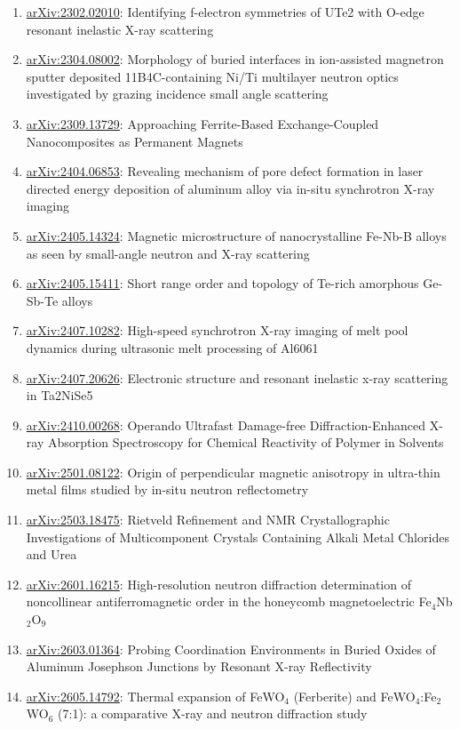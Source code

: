\begin{small}
\begin{enumerate}
  \item \href{https://arxiv.org/abs/2302.02010}{arXiv:2302.02010}: Identifying f-electron symmetries of UTe2 with O-edge resonant inelastic X-ray scattering
  \item \href{https://arxiv.org/abs/2304.08002}{arXiv:2304.08002}: Morphology of buried interfaces in ion-assisted magnetron sputter deposited 11B4C-containing Ni/Ti multilayer neutron optics investigated by grazing incidence small angle scattering
  \item \href{https://arxiv.org/abs/2309.13729}{arXiv:2309.13729}: Approaching Ferrite-Based Exchange-Coupled Nanocomposites as Permanent Magnets
  \item \href{https://arxiv.org/abs/2404.06853}{arXiv:2404.06853}: Revealing mechanism of pore defect formation in laser directed energy deposition of aluminum alloy via in-situ synchrotron X-ray imaging
  \item \href{https://arxiv.org/abs/2405.14324}{arXiv:2405.14324}: Magnetic microstructure of nanocrystalline Fe-Nb-B alloys as seen by small-angle neutron and X-ray scattering
  \item \href{https://arxiv.org/abs/2405.15411}{arXiv:2405.15411}: Short range order and topology of Te-rich amorphous Ge-Sb-Te alloys
  \item \href{https://arxiv.org/abs/2407.10282}{arXiv:2407.10282}: High-speed synchrotron X-ray imaging of melt pool dynamics during ultrasonic melt processing of Al6061
  \item \href{https://arxiv.org/abs/2407.20626}{arXiv:2407.20626}: Electronic structure and resonant inelastic x-ray scattering in Ta2NiSe5
  \item \href{https://arxiv.org/abs/2410.00268}{arXiv:2410.00268}: Operando Ultrafast Damage-free Diffraction-Enhanced X-ray Absorption Spectroscopy for Chemical Reactivity of Polymer in Solvents
  \item \href{https://arxiv.org/abs/2501.08122}{arXiv:2501.08122}: Origin of perpendicular magnetic anisotropy in ultra-thin metal films studied by in-situ neutron reflectometry
  \item \href{https://arxiv.org/abs/2503.18475}{arXiv:2503.18475}: Rietveld Refinement and NMR Crystallographic Investigations of Multicomponent Crystals Containing Alkali Metal Chlorides and Urea
  \item \href{https://arxiv.org/abs/2601.16215}{arXiv:2601.16215}: High-resolution neutron diffraction determination of noncollinear antiferromagnetic order in the honeycomb magnetoelectric Fe$_{4}$Nb$_{2}$O$_{9}$
  \item \href{https://arxiv.org/abs/2603.01364}{arXiv:2603.01364}: Probing Coordination Environments in Buried Oxides of Aluminum Josephson Junctions by Resonant X-ray Reflectivity
  \item \href{https://arxiv.org/abs/2605.14792}{arXiv:2605.14792}: Thermal expansion of FeWO$_4$ (Ferberite) and FeWO$_4$:Fe$_2$WO$_6$ (7:1): a comparative X-ray and neutron diffraction study
\end{enumerate}
\end{small}
